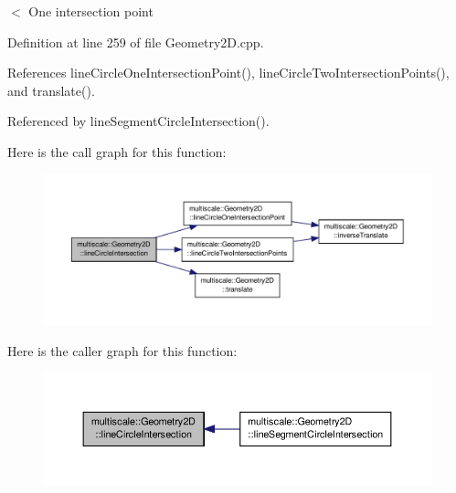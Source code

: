$<$ One intersection point 

Definition at line 259 of file Geometry2\-D.\-cpp.



References line\-Circle\-One\-Intersection\-Point(), line\-Circle\-Two\-Intersection\-Points(), and translate().



Referenced by line\-Segment\-Circle\-Intersection().



Here is the call graph for this function\-:\nopagebreak
\begin{figure}[H]
\begin{center}
\leavevmode
\includegraphics[width=350pt]{classmultiscale_1_1Geometry2D_ab04c08f83d066f0d936d516d015ea62c_cgraph}
\end{center}
\end{figure}




Here is the caller graph for this function\-:\nopagebreak
\begin{figure}[H]
\begin{center}
\leavevmode
\includegraphics[width=350pt]{classmultiscale_1_1Geometry2D_ab04c08f83d066f0d936d516d015ea62c_icgraph}
\end{center}
\end{figure}


